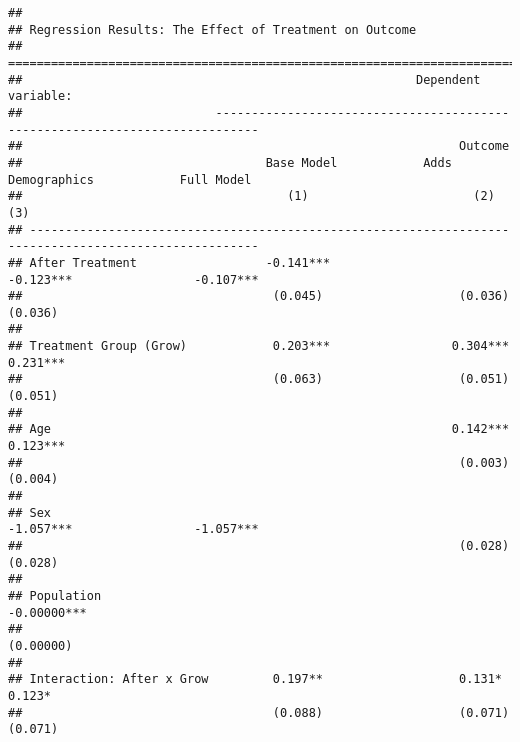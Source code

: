 \documentclass[
]{article}
\begin{document}
\begin{verbatim}
## 
## Regression Results: The Effect of Treatment on Outcome
## ======================================================================================================
##                                                       Dependent variable:                             
##                           ----------------------------------------------------------------------------
##                                                             Outcome                                   
##                                  Base Model            Adds Demographics            Full Model        
##                                     (1)                       (2)                       (3)           
## ------------------------------------------------------------------------------------------------------
## After Treatment                  -0.141***                 -0.123***                 -0.107***        
##                                   (0.045)                   (0.036)                   (0.036)         
##                                                                                                       
## Treatment Group (Grow)            0.203***                 0.304***                  0.231***         
##                                   (0.063)                   (0.051)                   (0.051)         
##                                                                                                       
## Age                                                        0.142***                  0.123***         
##                                                             (0.003)                   (0.004)         
##                                                                                                       
## Sex                                                        -1.057***                 -1.057***        
##                                                             (0.028)                   (0.028)         
##                                                                                                       
## Population                                                                          -0.00000***       
##                                                                                      (0.00000)        
##                                                                                                       
## Interaction: After x Grow         0.197**                   0.131*                    0.123*          
##                                   (0.088)                   (0.071)                   (0.071)         

\end{verbatim}
\end{document}
